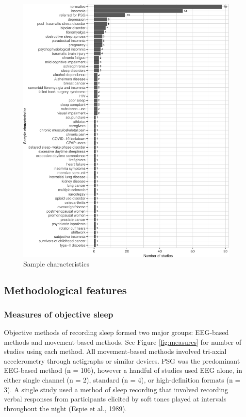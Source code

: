 \documentclass[
]{article}
\begin{document}
\begin{figure}
\centering
\includegraphics{review_markdown_files/figure-latex/samplechar-1.pdf}
\caption{\label{fig:samplechar}Sample characteristics}
\end{figure}

\subsection{Methodological features}\label{resultsandsynthesis}

\subsubsection{Measures of objective sleep}\label{measures-of-objective-sleep}

Objective methods of recording sleep formed two major groups: EEG-based methods and movement-based methods. See Figure \ref{fig:measures} for number of studies using each method. All movement-based methods involved tri-axial accelerometry through actigraphs or similar devices. PSG was the predominant EEG-based method (n = 106), however a handful of studies used EEG alone, in either single channel (n = 2), standard (n = 4), or high-definition formats (n = 3). A single study used a method of sleep recording that involved recording verbal responses from participants elicited by soft tones played at intervals throughout the night (Espie et al., 1989).
\end{document}
